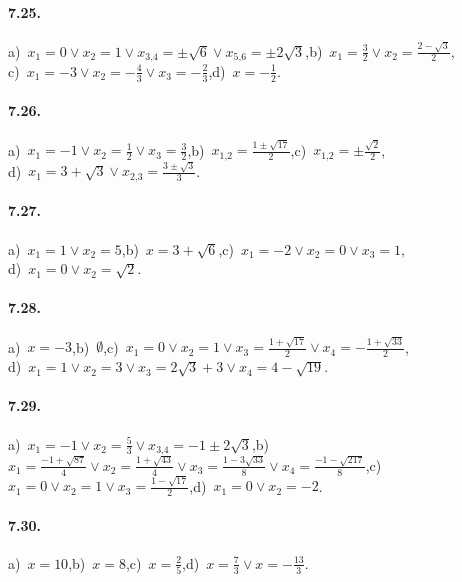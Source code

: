 \paragraph{7.25.} a)~$x_1=0\vee x_2=1\vee x_{3\text{,}4}=\pm \sqrt 6\vee x_{5\text{,}6}=\pm 2\sqrt 3$,\quad b)~$x_1=\frac 3 2\vee x_2=\frac{2-\sqrt 3} 2$,\protect\\
\quad c)~$x_1=-3\vee x_2=-\frac 4 3\vee x_3=-\frac 2 3$,\quad d)~$x=-\frac 1 2$.

\paragraph{7.26.} a)~$x_1=-1\vee x_2=\frac 1 2\vee x_3=\frac 3 2$,\quad b)~$x_{1\text{,}2}=\frac{1\pm \sqrt{17}} 2$,\quad c)~$x_{1\text{,}2}=\pm \frac{\sqrt 2} 2$,\protect\\
\quad d)~$x_1=3+\sqrt 3\vee x_{2\text{,}3}=\frac{3\pm \sqrt 3} 3$.

\paragraph{7.27.} a)~$x_1=1\vee x_2=5$,\quad b)~$x=3+\sqrt 6$,\quad c)~$x_1=-2\vee x_2=0\vee x_3=1$,\protect\\
\quad d)~$x_1=0\vee x_2=\sqrt 2$.

\paragraph{7.28.} a)~$x=-3$,\quad b)~$\emptyset $,\quad c)~$x_1=0\vee x_2=1\vee x_3=\frac{1+\sqrt{17}} 2\vee x_4=-\frac{1+\sqrt{33}} 2$,\protect\\
\quad d)~$x_1=1\vee x_2=3\vee x_3=2\sqrt 3+3\vee x_4=4-\sqrt{19}$.

\paragraph{7.29.} a)~$x_1=-1\vee x_2=\frac 5 3\vee x_{3\text{,}4}=-1\pm 2\sqrt 3$,\quad b)~$x_1=\frac{-1+\sqrt{87}} 4\vee x_2=\frac{1+\sqrt{43}} 4\vee x_3=\frac{1-3\sqrt{33}} 8\vee x_4=\frac{-1-\sqrt{217}} 8$,\quad c)~$x_1=0\vee x_2=1\vee x_3=\frac{1-\sqrt{17}} 2$,\quad d)~$x_1=0\vee x_2=-2$.

\paragraph{7.30.} a)~$x=10$,\quad b)~$x=8$,\quad c)~$x=\frac{2}{5}$,\quad d)~$x=\frac{7}{3}\vee x=-\frac{13}{3}$.

